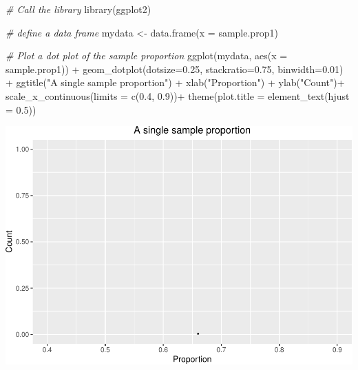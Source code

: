 \documentclass[
]{book}
\newenvironment{Shaded}{\begin{snugshade}}{\end{snugshade}}
\newcommand{\AttributeTok}[1]{\textcolor[rgb]{0.77,0.63,0.00}{#1}}
\newcommand{\CommentTok}[1]{\textcolor[rgb]{0.56,0.35,0.01}{\textit{#1}}}
\newcommand{\FloatTok}[1]{\textcolor[rgb]{0.00,0.00,0.81}{#1}}
\newcommand{\FunctionTok}[1]{\textcolor[rgb]{0.00,0.00,0.00}{#1}}
\newcommand{\NormalTok}[1]{#1}
\newcommand{\OtherTok}[1]{\textcolor[rgb]{0.56,0.35,0.01}{#1}}
\newcommand{\SpecialCharTok}[1]{\textcolor[rgb]{0.00,0.00,0.00}{#1}}
\newcommand{\StringTok}[1]{\textcolor[rgb]{0.31,0.60,0.02}{#1}}
\begin{document}
\begin{Shaded}
\begin{Highlighting}[]
\CommentTok{\# Call the library}
\FunctionTok{library}\NormalTok{(ggplot2)}
\end{Highlighting}
\end{Shaded}

\begin{Shaded}
\begin{Highlighting}[]
\CommentTok{\# define a data frame}
\NormalTok{mydata }\OtherTok{\textless{}{-}} \FunctionTok{data.frame}\NormalTok{(}\AttributeTok{x =}\NormalTok{ sample.prop1)}

\CommentTok{\# Plot a dot plot of the sample proportion}
\FunctionTok{ggplot}\NormalTok{(mydata, }\FunctionTok{aes}\NormalTok{(}\AttributeTok{x =}\NormalTok{ sample.prop1)) }\SpecialCharTok{+}
  \FunctionTok{geom\_dotplot}\NormalTok{(}\AttributeTok{dotsize=}\FloatTok{0.25}\NormalTok{, }\AttributeTok{stackratio=}\FloatTok{0.75}\NormalTok{, }\AttributeTok{binwidth=}\FloatTok{0.01}\NormalTok{) }\SpecialCharTok{+}
  \FunctionTok{ggtitle}\NormalTok{(}\StringTok{"A single sample proportion"}\NormalTok{) }\SpecialCharTok{+}  \FunctionTok{xlab}\NormalTok{(}\StringTok{"Proportion"}\NormalTok{) }\SpecialCharTok{+} \FunctionTok{ylab}\NormalTok{(}\StringTok{"Count"}\NormalTok{)}\SpecialCharTok{+}
  \FunctionTok{scale\_x\_continuous}\NormalTok{(}\AttributeTok{limits =} \FunctionTok{c}\NormalTok{(}\FloatTok{0.4}\NormalTok{, }\FloatTok{0.9}\NormalTok{))}\SpecialCharTok{+}
  \FunctionTok{theme}\NormalTok{(}\AttributeTok{plot.title =} \FunctionTok{element\_text}\NormalTok{(}\AttributeTok{hjust =} \FloatTok{0.5}\NormalTok{))}
\end{Highlighting}
\end{Shaded}

\includegraphics[width=1\linewidth]{Class_Activity_7_files/figure-latex/unnamed-chunk-5-1}
\end{document}
